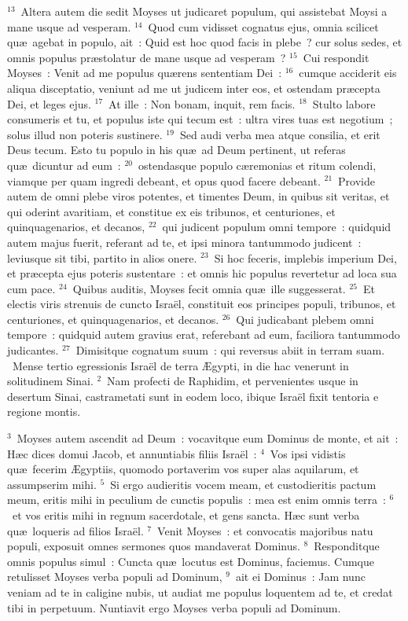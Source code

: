 ${}^{13}$~Altera autem die sedit Moyses ut judicaret populum, qui assistebat Moysi a mane usque ad vesperam.
${}^{14}$~Quod cum vidisset cognatus ejus, omnia scilicet qu\ae\ agebat in populo, ait~: Quid est hoc quod facis in plebe~? cur solus sedes, et omnis populus pr\ae stolatur de mane usque ad vesperam~?
${}^{15}$~Cui respondit Moyses~: Venit ad me populus qu\ae rens sententiam Dei~:
${}^{16}$~cumque acciderit eis aliqua disceptatio, veniunt ad me ut judicem inter eos, et ostendam pr\ae cepta Dei, et leges ejus.
${}^{17}$~At ille~: Non bonam, inquit, rem facis.
${}^{18}$~Stulto labore consumeris et tu, et populus iste qui tecum est~: ultra vires tuas est negotium~; solus illud non poteris sustinere.
${}^{19}$~Sed audi verba mea atque consilia, et erit Deus tecum. Esto tu populo in his qu\ae\ ad Deum pertinent, ut referas qu\ae\ dicuntur ad eum~:
${}^{20}$~ostendasque populo c\ae remonias et ritum colendi, viamque per quam ingredi debeant, et opus quod facere debeant.
${}^{21}$~Provide autem de omni plebe viros potentes, et timentes Deum, in quibus sit veritas, et qui oderint avaritiam, et constitue ex eis tribunos, et centuriones, et quinquagenarios, et decanos,
${}^{22}$~qui judicent populum omni tempore~: quidquid autem majus fuerit, referant ad te, et ipsi minora tantummodo judicent~: leviusque sit tibi, partito in alios onere.
${}^{23}$~Si hoc feceris, implebis imperium Dei, et pr\ae cepta ejus poteris sustentare~: et omnis hic populus revertetur ad loca sua cum pace.
${}^{24}$~Quibus auditis, Moyses fecit omnia qu\ae\ ille suggesserat.
${}^{25}$~Et electis viris strenuis de cuncto Isra\"el, constituit eos principes populi, tribunos, et centuriones, et quinquagenarios, et decanos.
${}^{26}$~Qui judicabant plebem omni tempore~: quidquid autem gravius erat, referebant ad eum, faciliora tantummodo judicantes.
${}^{27}$~Dimisitque cognatum suum~: qui reversus abiit in terram suam.
~Mense tertio egressionis Isra\"el de terra \AE gypti, in die hac venerunt in solitudinem Sinai.
${}^{2}$~Nam profecti de Raphidim, et pervenientes usque in desertum Sinai, castrametati sunt in eodem loco, ibique Isra\"el fixit tentoria e regione montis.


${}^{3}$~Moyses autem ascendit ad Deum~: vocavitque eum Dominus de monte, et ait~: H\ae c dices domui Jacob, et annuntiabis filiis Isra\"el~:
${}^{4}$~Vos ipsi vidistis qu\ae\ fecerim \AE gyptiis, quomodo portaverim vos super alas aquilarum, et assumpserim mihi.
${}^{5}$~Si ergo audieritis vocem meam, et custodieritis pactum meum, eritis mihi in peculium de cunctis populis~: mea est enim omnis terra~:
${}^{6}$~et vos eritis mihi in regnum sacerdotale, et gens sancta. H\ae c sunt verba qu\ae\ loqueris ad filios Isra\"el.
${}^{7}$~Venit Moyses~: et convocatis majoribus natu populi, exposuit omnes sermones quos mandaverat Dominus.
${}^{8}$~Responditque omnis populus simul~: Cuncta qu\ae\ locutus est Dominus, faciemus. Cumque retulisset Moyses verba populi ad Dominum,
${}^{9}$~ait ei Dominus~: Jam nunc veniam ad te in caligine nubis, ut audiat me populus loquentem ad te, et credat tibi in perpetuum. Nuntiavit ergo Moyses verba populi ad Dominum.


